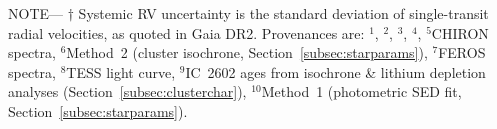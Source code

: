 \begin{table}
\begin{flushleft}
 \footnotesize{ \textsc{NOTE}---
$\dagger$ Systemic RV uncertainty is the standard deviation of single-transit radial velocities, as quoted in Gaia DR2. %
Provenances are:
$^1$\citet{gaia_collaboration_gaia_2018},
$^2$\citet{stassun_TIC8_2019},
$^3$\citet{skrutskie_tmass_2006},
$^4$\citet{wright_WISE_2010},
$^5$CHIRON spectra,
$^6$Method~2 (cluster isochrone, Section~\ref{subsec:starparams}),
$^7$FEROS spectra,
$^8$TESS light curve,
$^9$IC~2602 ages from isochrone \& lithium depletion analyses (Section~\ref{subsec:clusterchar}),
$^10$Method~1 (photometric SED fit, Section~\ref{subsec:starparams}).}
\end{flushleft}
\vspace{-0.5cm}
\end{table}
